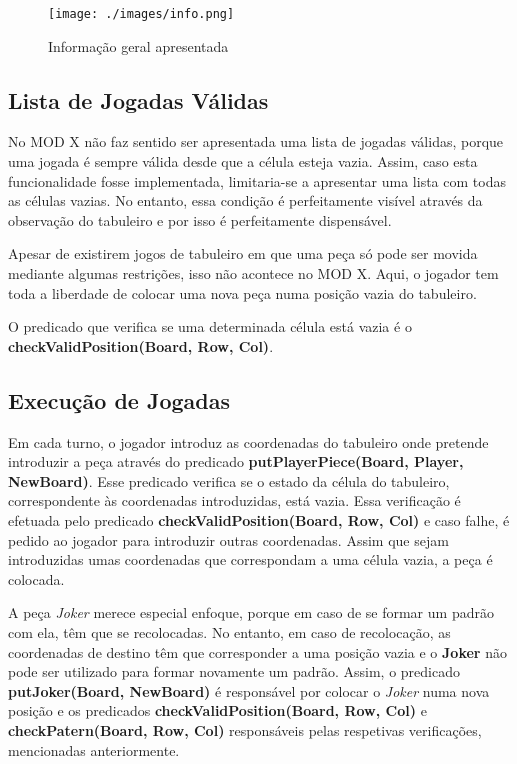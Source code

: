 \documentclass[a4paper]{article}
\begin{document}
\begin{itemize}
	\begin{figure}[h!]
		\begin{center}
			\texttt{[image: ./images/info.png]}
			\caption{Informação geral apresentada}
			\label{fig:5}
		\end{center}
	\end{figure}
	
\end{itemize}

\subsection{Lista de Jogadas Válidas\newline}

No MOD X não faz sentido ser apresentada uma lista de jogadas válidas, porque uma jogada é sempre válida desde que a célula esteja vazia. Assim, caso esta funcionalidade fosse implementada, limitaria-se a apresentar uma lista com todas as células vazias. No entanto, essa condição é perfeitamente visível através da observação do tabuleiro e por isso é perfeitamente dispensável.

Apesar de existirem jogos de tabuleiro em que uma peça só pode ser movida mediante algumas restrições, isso não acontece no MOD X. Aqui, o jogador tem toda a liberdade de colocar uma nova peça numa posição vazia do tabuleiro.

O predicado que verifica se uma determinada célula está vazia é o \textbf{checkValidPosition(Board, Row, Col)}.    

\subsection{Execução de Jogadas\newline}

Em cada turno, o jogador introduz as coordenadas do tabuleiro onde pretende introduzir a peça através do predicado \textbf{putPlayerPiece(Board, Player, NewBoard)}. Esse predicado verifica se o estado da célula do tabuleiro, correspondente às coordenadas introduzidas, está vazia. Essa verificação é efetuada pelo predicado \textbf{checkValidPosition(Board, Row, Col)} e caso falhe, é pedido ao jogador para introduzir outras coordenadas. Assim que sejam introduzidas umas coordenadas que correspondam a uma célula vazia, a peça é colocada.

A peça \textit{Joker} merece especial enfoque, porque em caso de se formar um padrão com ela, têm que se recolocadas. No entanto, em caso de recolocação, as coordenadas de destino têm que corresponder a uma posição vazia e o \textbf{Joker} não pode ser utilizado para formar novamente um padrão. Assim, o predicado \textbf{putJoker(Board, NewBoard)} é responsável por colocar o \textit{Joker} numa nova posição e os predicados \textbf{checkValidPosition(Board, Row, Col)} e \textbf{checkPatern(Board, Row, Col)} responsáveis pelas respetivas verificações, mencionadas anteriormente. 
\end{document}
